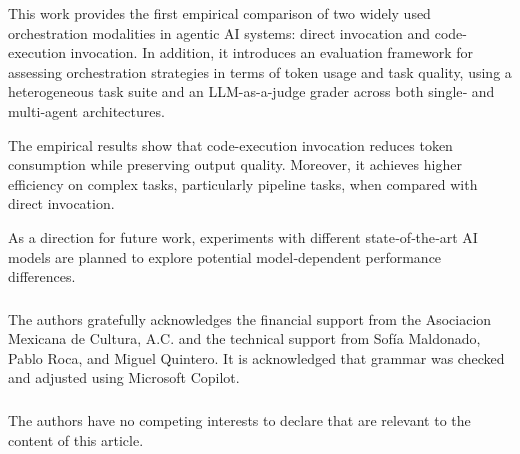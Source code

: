 \documentclass[runningheads]{llncs}
\begin{document}
This work provides the first empirical comparison of two widely used orchestration modalities in agentic AI systems: direct invocation and code-execution invocation. In addition, it introduces an evaluation framework for assessing orchestration strategies in terms of token usage and task quality, using a heterogeneous task suite and an LLM-as-a-judge grader across both single‑ and multi‑agent architectures.

The empirical results show that code-execution invocation reduces token consumption while preserving output quality. Moreover, it achieves higher efficiency on complex tasks, particularly pipeline tasks, when compared with direct invocation.

As a direction for future work, experiments with different state‑of‑the‑art AI models are planned to explore potential model‑dependent performance differences.


\begin{credits}

\subsubsection{\ackname}

The authors gratefully acknowledges the financial support from the Asociacion Mexicana de Cultura, A.C. and the technical support from Sofía Maldonado, Pablo Roca, and Miguel Quintero. It is acknowledged that grammar was checked and adjusted using Microsoft Copilot.


\subsubsection{\discintname}
The authors have no competing interests to declare that are relevant to the content of this article.
\end{credits}





\end{document}
